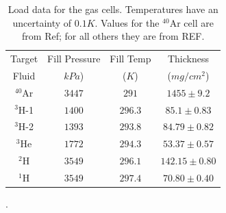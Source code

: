 \documentclass[final,5p,times,twocolumn]{elsarticle}
\begin{document}
\begin{table}[!h]
\centering
\begin{adjustbox}{width=0.5\textwidth}
\begin{tabular}{|c|c|c|c|}
	\hline 
	Target       & Fill Pressure & Fill Temp    & Thickness \\
	Fluid  		 &	$kPa$)		 &	($K$) 	    & ($mg/cm^2$) \\
	\hline 
	$^{40}$Ar	 & $3447$ 		 & $291$	    &  $1455\pm9.2$ \\ 
	\hline 
	$^{3}$H-1 	 & $1400$		 & $296.3$	    &  $85.1\pm 0.83$ \\ 
	\hline 
	$^{3}$H-2	 & $1393$		 & $293.8$		&  $84.79\pm0.82$ \\
	\hline
	$^{3}$He	 & $1772$		 & $294.3$	    &  $53.37\pm0.57$ \\ 
	\hline 
	$^{2}$H 	 & $3549$		 & $296.1$	    &  $142.15\pm0.80$ \\ 
	\hline 
	$^{1}$H 	 & $3549$		 & $297.4$	    &  $70.80\pm0.40$ \\ 
	\hline 
\end{tabular}
\end{adjustbox}
\caption{Load data for the gas cells. Temperatures have an uncertainty of $0.1K$. Values for the $^{40}$Ar cell are from  Ref\cite{ar_config}; for all others they are from REF\cite{cellconfig}. }.
\label{tab:fill_tar}
\end{table}
 
\end{document}
